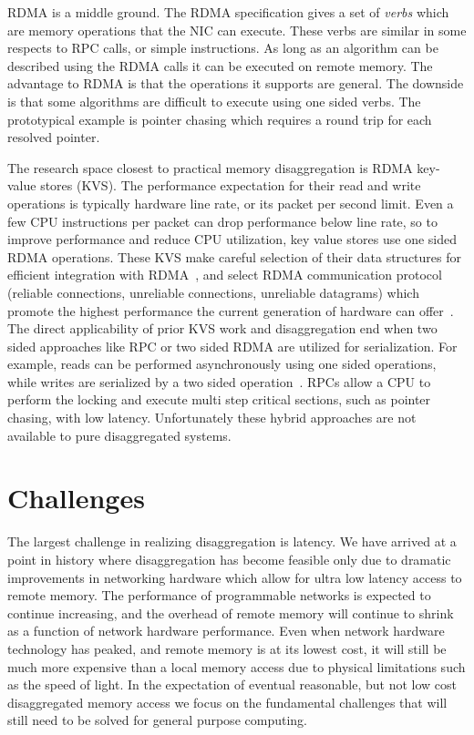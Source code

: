 RDMA is a middle ground. The RDMA specification gives a set of \textit{verbs}
which are memory operations that the NIC can execute. These verbs are similar in
some respects to RPC calls, or simple instructions. As long as an algorithm can
be described using the RDMA calls it can be executed on remote memory. The
advantage to RDMA is that the operations it supports are general. The downside
is that some algorithms are difficult to execute using one sided verbs. The
prototypical example is pointer chasing which requires a round trip for each
resolved pointer.

The research space closest to practical memory disaggregation is RDMA key-value
stores (KVS). The performance expectation for their read and write operations is
typically hardware line rate, or its packet per second limit. Even a few CPU
instructions per packet can drop performance below line rate, so to improve
performance and reduce CPU utilization, key value stores use one sided RDMA
operations. These KVS make careful selection of their data structures for
efficient integration with RDMA~\cite{hopscotch,cuckoo}, and select RDMA
communication protocol (reliable connections, unreliable connections, unreliable
datagrams) which promote the highest performance the current generation of
hardware can offer~\cite{herd,storm}. The direct applicability of prior KVS work
and disaggregation end when two sided approaches like RPC or two sided RDMA are
utilized for serialization. For example, reads can be performed asynchronously
using one sided operations, while writes are serialized by a two sided
operation~\cite{pilaf}. RPCs allow a CPU to perform the locking and execute
multi step critical sections, such as pointer chasing, with low latency.
Unfortunately these hybrid approaches are not available to pure disaggregated
systems.


\section{Challenges}

The largest challenge in realizing disaggregation is latency. We have arrived at
a point in history where disaggregation has become feasible only due to dramatic
improvements in networking hardware which allow for ultra low latency access to
remote memory. The performance of programmable networks is expected to continue
increasing, and the overhead of remote memory will continue to shrink as a
function of network hardware performance.  Even when network hardware technology
has peaked, and remote memory is at its lowest cost, it will still be much more
expensive than a local memory access due to physical limitations such as the
speed of light. In the expectation of eventual reasonable, but not low cost
disaggregated memory access we focus on the fundamental challenges that will
still need to be solved for general purpose computing. 

